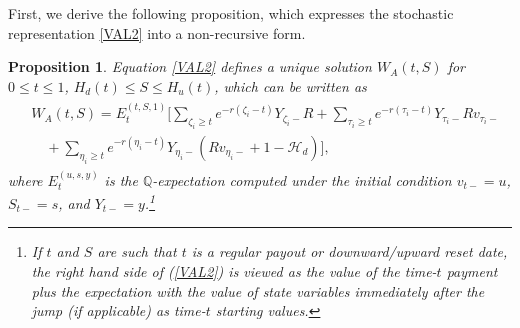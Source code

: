 \documentclass[final,pdftex]{ectaart}
\theoremstyle{plain}
\newtheorem{proposition}{Proposition}
\begin{document}
\begin{appendices}
First, we derive the following proposition, which expresses the stochastic representation \eqref{VAL2} into a non-recursive form.
\begin{proposition}\label{prop:nonrecur}
	Equation \eqref{VAL2} defines a unique solution $W_A(t,S)$ for $0\le t\le 1$, $H_d(t)\le S\le H_u(t)$, which can be written as
	\begin{align}\label{VALnonrecur}
	\begin{split}
	&W_A(t,S)=E_t^{(t,S,1)}\Bigg[\sum_{\zeta_i\ge t}e^{-r(\zeta_i-t)}Y_{\zeta_i-}R+\sum_{\tau_i\ge t}e^{-r(\tau_i-t)}Y_{\tau_i-}Rv_{\tau_i-}\\
	&\quad+\sum_{\eta_i\ge t}e^{-r(\eta_i-t)}Y_{\eta_i-}(Rv_{\eta_i-}+1-\mathcal{H}_d)\Bigg],
	\end{split}
	\end{align}
	where $E^{(u,s,y)}_t$ is the $\mathbb{Q}$-expectation computed under the initial condition $v_{t-}=u$, $S_{t-}=s$, and $Y_{t-}=y$.\footnote{If $t$ and $S$ are such that $t$ is a regular payout or downward/upward reset date, the right hand side of (\ref{VAL2}) is viewed as the value of the time-$t$ payment plus the expectation with the value of state variables immediately after the jump (if applicable) as time-$t$ starting values.}
\end{proposition}


\end{appendices}
\end{document}
